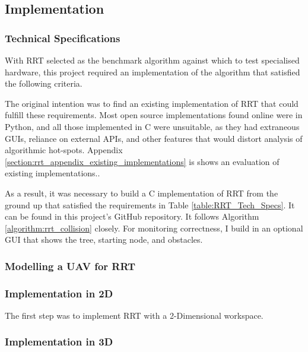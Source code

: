         

\newpage

\subsection{Implementation}\label{section:implementation}
    
    \subsubsection{Technical Specifications}

        With \gls{RRT} selected as the benchmark algorithm against which to test specialised hardware, this project required an implementation of the algorithm that satisfied the following criteria.

        

        The original intention was to find an existing implementation of RRT that could fulfill these requirements. Most open source implementations found online were in Python, and all those implemented in C were unsuitable, as they had extraneous \gls{GUI}s, reliance on external \gls{API}s, and other features that would distort analysis of algorithmic hot-spots. Appendix \ref{section:rrt_appendix_existing_implementations} is shows an evaluation of existing implementations.\cite{RoboJackets2019}\cite{Planning2019}\cite{Sourishg2017}\cite{Vss2sn2019}.

        As a result, it was necessary to build a C implementation of RRT from the ground up that satisfied the requirements in Table \ref{table:RRT_Tech_Specs}. It can be found in this project's GitHub repository. It follows Algorithm \ref{algorithm:rrt_collision} closely. For monitoring correctness, I build in an optional \gls{GUI} that shows the tree, starting node, and obstacles.

    \subsubsection*{Modelling a \gls{UAV} for RRT}

    \subsubsection{Implementation in 2D}
    The first step was to implement RRT with a 2-Dimensional workspace. 
    

    \subsubsection{Implementation in 3D}
    
